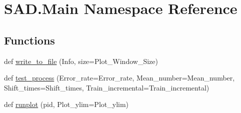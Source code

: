 \hypertarget{namespaceSAD_1_1Main}{}\section{S\+A\+D.\+Main Namespace Reference}
\label{namespaceSAD_1_1Main}
\subsection*{Functions}
\begin{DoxyCompactItemize}
\item 
def \hyperlink{namespaceSAD_1_1Main_abbb1568474a387de6c9861c1d9fb7dc7}{write\+\_\+to\+\_\+file} (Info, size=Plot\+\_\+\+Window\+\_\+\+Size)
\item 
def \hyperlink{namespaceSAD_1_1Main_ac7af90e87d6b97c34a6c0a61050f7bbb}{test\+\_\+process} (Error\+\_\+rate=Error\+\_\+rate, Mean\+\_\+number=Mean\+\_\+number, Shift\+\_\+times=Shift\+\_\+times, Train\+\_\+incremental=Train\+\_\+incremental)
\item 
def \hyperlink{namespaceSAD_1_1Main_a03f50b3953bf494084aa0db03de3106e}{runplot} (pid, Plot\+\_\+ylim=Plot\+\_\+ylim)
\end{DoxyCompactItemize}
